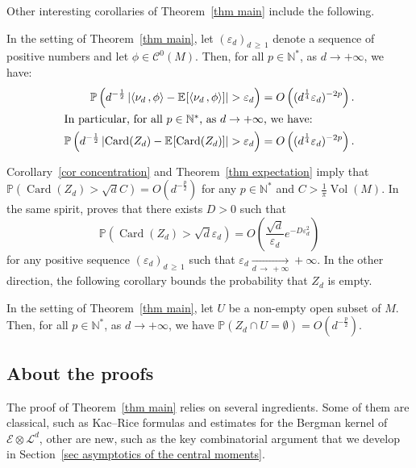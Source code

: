 \documentclass[10pt]{amsart}
\theoremstyle{definition}\newtheorem{defi}[theo]{Definition}\newtheorem{rema}[theo]{Remark}\newtheorem{exam}[theo]{Example}\newtheorem{exem}[theo]{Example}\newtheorem{nota}[theo]{Notation}
\DeclareMathOperator{\card}{Card}
\DeclareMathOperator{\Vol}{Vol}
\newcommand{\E}{\mathcal{E}}
\renewcommand{\L}{\mathcal{L}}
\newcommand{\clC}{\mathcal{C}}
\newcommand{\N}{\mathbb{N}}
\renewcommand{\P}{\mathbb{P}}
\newcommand{\esp}[2][]{\mathbb{E}_{#1}\!\left[#2 \right]}
\newcommand{\norm}[1]{\left\lvert #1 \right\rvert}
\newcommand{\prsc}[2]{\left\langle #1\,, #2 \right\rangle}
\newcommand{\vol}[1]{\Vol\!\left(#1\right)}
\renewcommand{\epsilon}{\varepsilon}
\renewcommand{\geq}{\geqslant}
\begin{document}
Other interesting corollaries of Theorem~\ref{thm main} include the following.

\begin{coro}\label{cor concentration}
In the setting of Theorem~\ref{thm main}, let $(\epsilon_d)_{d\,\geq\,1}$ denote a sequence of positive numbers and let $\phi \in \clC^0(M)$. Then, for all $p \in \N^*$, as $d \to +\infty$, we have:
\begin{align*}
\P\left(d^{-\frac{1}{2}}\norm{\prsc{\nu_d}{\phi} - \esp{\prsc{\nu_d}{\phi}}} > \epsilon_d \right) &= O\left((d^\frac{1}{4}\epsilon_d)^{-2p}\right).
\\
\intertext{In particular, for all $p \in \N^*$, as $d \to +\infty$, we have:}
\P\left(d^{-\frac{1}{2}}\norm{\card(Z_d) - \esp{\card(Z_d)}} > \epsilon_d \right) &= O\left((d^\frac{1}{4}\epsilon_d)^{-2p}\right).
\end{align*}
\end{coro}

Corollary~\ref{cor concentration} and Theorem~\ref{thm expectation} imply that $\P(\card(Z_d) > \sqrt{d}C)=O(d^{-\frac{p}{2}})$ for any $p \in \N^*$ and $C > \frac{1}{\pi}\vol{M}$. In the same spirit, \cite[Theorem~2]{GW2011} proves that there exists $D>0$ such that
\[
\P\left(\card(Z_d) > \sqrt{d}\epsilon_d\right)=O\!\left(\frac{\sqrt{d}}{\epsilon_d}e^{-D\epsilon_d^2}\right)
\]
for any positive sequence $(\epsilon_d)_{d\,\geq\,1}$ such that $\epsilon_d \xrightarrow[d\,\to\,+\infty]{} +\infty$. In the other direction, the following corollary bounds the probability that $Z_d$ is empty.

\begin{coro}\label{cor hole probability}
In the setting of Theorem~\ref{thm main}, let $U$ be a non-empty open subset of $M$. Then, for all $p \in \N^*$, as $d \to +\infty$, we have $\P(Z_d \cap U = \emptyset) = O(d^{-\frac{p}{2}})$.
\end{coro}


\subsection*{About the proofs}

The proof of Theorem~\ref{thm main} relies on several ingredients. Some of them are classical, such as Kac--Rice formulas and estimates for the Bergman kernel of $\E \otimes \L^d$, other are new, such as the key combinatorial argument that we develop in Section~\ref{sec asymptotics of the central moments}.
\end{document}
